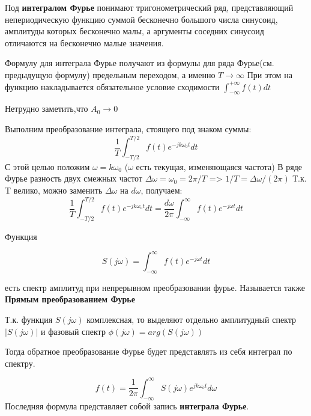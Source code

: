 Под {\bfseries интегралом Фурье} понимают тригонометрический ряд, представляющий непериодическую функцию суммой бесконечно большого числа синусоид, амплитуды которых бесконечно малы, а аргументы соседних синусоид отличаются на бесконечно малые значения.

Формулу для интеграла Фурье получают из формулы для ряда Фурье(см. предыдущую формулу) предельным переходом, а именно $T \rightarrow \infty$
При этом на функцию накладывается обязательное условие сходимости $ \int_{-\infty}^{+\infty} f(t)dt $

Нетрудно заметить,что $A_0 \rightarrow 0$

Выполним преобразование интеграла, стоящего под знаком суммы:
$$
\frac{1}{T}\int_{-T/2}^{T/2} f(t) e^{-jk\omega_0 t} dt
$$
С этой целью положим $\omega = k\omega_0$ ($\omega$ есть текущая, изменяющаяся частота) В ряде Фурье разность двух смежных частот $\Delta\omega=\omega_0 =2\pi/T$ => $1/T = \Delta\omega/(2\pi)$ Т.к. T велико, можно заменить $\Delta\omega$ на $d\omega$, получаем:
\begin{equation}
 \frac{1}{T} \int_{-T/2}^{T/2}f(t) e^{-j k \omega_o t} dt =  \frac{d \omega}{2 \pi} \int_{-\infty}^{\infty}f(t) e^{-j \omega t} dt
\end{equation}

Функция 

\begin{equation}
S(j \omega) = \int_{-\infty}^{\infty}f(t) e^{-j \omega t} dt
\end{equation}

есть спектр амплитуд при непрерывном преобразовании фурье. Называется также {\bfseries Прямым преобразованием Фурье}

Т.к. функция $ S(j \omega) $ комплексная, то выделяют отдельно амплитудный спектр $ |S(j \omega)| $ и фазовый спектр $ \phi(j \omega)=arg(S(j \omega)) $

Тогда обратное преобразование Фурье будет представлять из себя интеграл по спектру.

\begin{equation}
f(t) = \frac{1}{2\pi}\int_{-\infty}^{\infty}S(j \omega)e^{j k \omega_o t} d \omega
\end{equation}
Последняя формула представляет собой запись {\bfseries интеграла Фурье}.

\pagebreak
